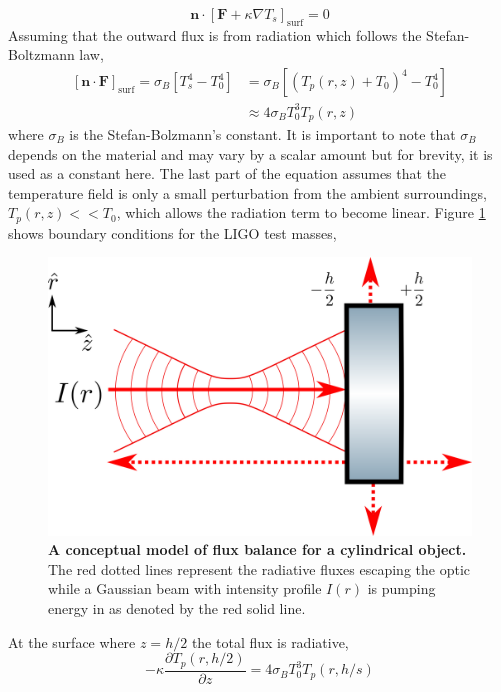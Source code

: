 	\begin{equation}
	\textbf{n} \cdot [ \textbf{F} + \kappa \nabla T_s]_{\text{surf}} = 0 
	\end{equation}
	Assuming that the outward flux is from radiation which follows the Stefan-Boltzmann law,
	\begin{equation}\label{eq:heat_flux}
	\begin{aligned}
	[\textbf{n} \cdot  \textbf{F}]_{\text{surf}} = \sigma_B  [T_s^4 - T_0^4] 	&= \sigma_B [(T_p(r,z) + T_0)^4 - T_0^4] \\
																			&\approx 4 \sigma_B T_0^3 T_p(r,z)
	\end{aligned}
	\end{equation}
	where $\sigma_B$ is the Stefan-Bolzmann's constant.  It is important to note that $\sigma_B$ depends on the material and may vary by a scalar amount but for brevity, it is used as a constant here.  The last part of the equation assumes that the temperature field is only a small perturbation from the ambient surroundings, $T_p(r,z) << T_0$, which allows the radiation term to become linear.  Figure \ref{fig:ThermalLensFlux} shows boundary conditions for the LIGO test masses,
	
	\begin{figure}[ht!]
		\centering
		\includegraphics[width=.6 \textwidth]{../Figures/ThermalLensFlux.png}
		\caption[A conceptual model of flux balance for a cylindrical object.]  
		{\textbf{A conceptual model of flux balance for a cylindrical object.} The red dotted lines represent the radiative fluxes escaping the optic while a Gaussian beam with intensity profile $I(r)$ is pumping energy in as denoted by the red solid line.}
		\label{fig:ThermalLensFlux}
	\end{figure}

	At the surface where $z=h/2$ the total flux is radiative,
	\begin{equation}\label{eq:faceh2}
	-\kappa \frac{\partial T_p(r,h/2)}{\partial z} = 4 \sigma_B T_0^3 T_p(r,h/s)
	\end{equation}
	
